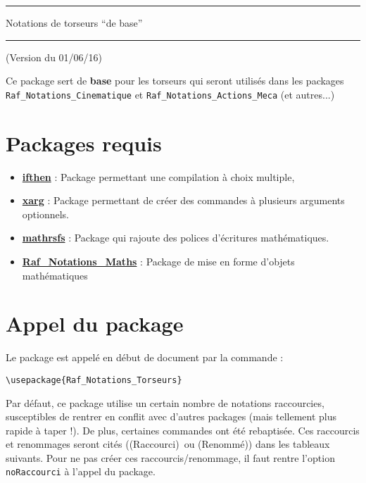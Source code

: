 \documentclass[a4paper,10pt]{article}
\newcommand{\rac}{({\color{red}Raccourci})}
\newcommand{\ren}{({\color{blue}Renommé})}
\begin{document}
	\begin{center}
		\hrule{\Large Notations de torseurs ``de base''}\\\hrule
	\end{center}

	(Version du 01/06/16)

	Ce package sert de \textbf{base} pour les torseurs qui seront utilisés dans les packages \verb!Raf_Notations_Cinematique! et \verb!Raf_Notations_Actions_Meca! (et autres...)

	\section{Packages requis}

	\begin{itemize}
		\item \href{http://www.ctan.org/pkg/ifthen}{\textbf{ifthen}} : Package permettant une compilation à choix multiple,
		\item \href{http://tug.ctan.org/tex-archive/macros/latex/contrib/xargs}{\textbf{xarg}} : Package permettant de créer des commandes à plusieurs arguments optionnels.
		\item \href{http://www.ctan.org/pkg/mathrsfs}{\textbf{mathrsfs}} : Package qui rajoute des polices d'écritures mathématiques.
		\item \href{http://enseignement.allais.eu/page-latex}{\textbf{Raf\_Notations\_Maths}} : Package de mise en forme d'objets mathématiques
	\end{itemize}

	\section{Appel du package}
	Le package est appelé en début de document par la commande :
	\begin{verbatim}
\usepackage{Raf_Notations_Torseurs}
	\end{verbatim}

	Par défaut, ce package utilise un certain nombre de notations raccourcies, susceptibles de rentrer en conflit avec d'autres packages (mais tellement plus rapide à taper !).
	De plus, certaines commandes ont été rebaptisée.
	Ces raccourcis et renommages seront cités (\rac\ ou \ren) dans les tableaux suivants.
	Pour ne pas créer ces raccourcis/renommage, il faut rentre l'option \verb!noRaccourci! à l'appel du package.
\end{document}
